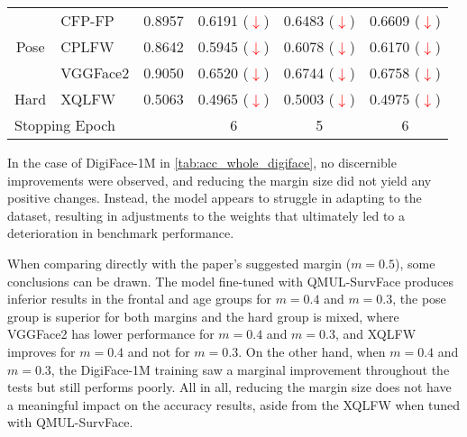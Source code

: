 \documentclass[class=report, crop=false, a4paper, 12pt]{standalone}
\begin{document}
\begin{table}[H]
{\begin{tabular}{|clc|c|c|c|}
    \multicolumn{1}{|c|}{}                          & \multicolumn{1}{l|}{CFP-FP}   & {\color[HTML]{333333} 0.8957} & {\color[HTML]{333333} 0.6191 (\textcolor{red}{$\downarrow$})} & {\color[HTML]{333333} 0.6483 (\textcolor{red}{$\downarrow$})} & {\color[HTML]{333333} 0.6609 (\textcolor{red}{$\downarrow$})} \\ \cline{2-6} 
    \multicolumn{1}{|c|}{\multirow{-2}{*}{Pose}}    & \multicolumn{1}{l|}{CPLFW}    & {\color[HTML]{333333} 0.8642} & {\color[HTML]{333333} 0.5945 (\textcolor{red}{$\downarrow$})} & {\color[HTML]{333333} 0.6078 (\textcolor{red}{$\downarrow$})} & {\color[HTML]{333333} 0.6170 (\textcolor{red}{$\downarrow$})} \\ \hline
    \multicolumn{1}{|c|}{}                          & \multicolumn{1}{l|}{VGGFace2} & {\color[HTML]{333333} 0.9050} & {\color[HTML]{333333} 0.6520 (\textcolor{red}{$\downarrow$})} & {\color[HTML]{333333} 0.6744 (\textcolor{red}{$\downarrow$})} & {\color[HTML]{333333} 0.6758 (\textcolor{red}{$\downarrow$})} \\ \cline{2-6} 
    \multicolumn{1}{|c|}{\multirow{-2}{*}{Hard}}    & \multicolumn{1}{l|}{XQLFW}    & {\color[HTML]{333333} 0.5063} & {\color[HTML]{333333} 0.4965 (\textcolor{red}{$\downarrow$})} & {\color[HTML]{333333} 0.5003 (\textcolor{red}{$\downarrow$})} & {\color[HTML]{333333} 0.4975 (\textcolor{red}{$\downarrow$})} \\ \hline
    \multicolumn{3}{|l|}{Stopping Epoch}                                                                            & 6                                  & 5                                  & 6                                  \\ \hline
    \end{tabular}%
    }
\end{table}

\par In the case of DigiFace-1M in \autoref{tab:acc_whole_digiface}, no discernible improvements were observed, and reducing the margin size did not yield any positive changes. Instead, the model appears to struggle in adapting to the dataset, resulting in adjustments to the weights that ultimately led to a deterioration in benchmark performance.  

\par When comparing directly with the paper's suggested margin ($m=0.5$), some conclusions can be drawn. The model fine-tuned with QMUL-SurvFace produces inferior results in the frontal and age groups for $m=0.4$ and $m=0.3$, the pose group is superior for both margins and the hard group is mixed, where VGGFace2 has lower performance for $m=0.4$ and $m=0.3$, and XQLFW improves for $m=0.4$ and not for $m=0.3$. On the other hand, when $m=0.4$ and $m=0.3$, the DigiFace-1M training saw a marginal improvement throughout the tests but still performs poorly. All in all, reducing the margin size does not have a meaningful impact on the accuracy results, aside from the XQLFW when tuned with QMUL-SurvFace.
\end{document}
